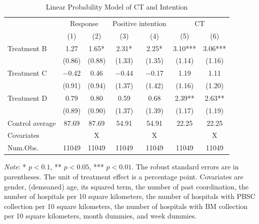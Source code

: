 \documentclass[12pt, a4paper]{article}
\begin{document}
\begin{table}

\caption{\label{tab:stock-reg}Linear Probability Model of CT and Intention}
\centering
\fontsize{9}{11}\selectfont
\begin{threeparttable}
\begin{tabular}[t]{lcccccc}
\toprule
\multicolumn{1}{c}{ } & \multicolumn{2}{c}{Response} & \multicolumn{2}{c}{Positive intention} & \multicolumn{2}{c}{CT} \\
\cmidrule(l{3pt}r{3pt}){2-3} \cmidrule(l{3pt}r{3pt}){4-5} \cmidrule(l{3pt}r{3pt}){6-7}
  & (1) & (2) & (3) & (4) & (5) & (6)\\
\midrule
Treatment B & \num{1.27} & \num{1.65}* & \num{2.31}* & \num{2.25}* & \num{3.10}*** & \num{3.06}***\\
 & (\num{0.86}) & (\num{0.88}) & (\num{1.33}) & (\num{1.35}) & (\num{1.14}) & (\num{1.16})\\
Treatment C & \num{-0.42} & \num{0.46} & \num{-0.44} & \num{-0.17} & \num{1.19} & \num{1.11}\\
 & (\num{0.91}) & (\num{0.94}) & (\num{1.37}) & (\num{1.42}) & (\num{1.16}) & (\num{1.20})\\
Treatment D & \num{0.79} & \num{0.80} & \num{0.59} & \num{0.68} & \num{2.39}** & \num{2.63}**\\
 & (\num{0.89}) & (\num{0.90}) & (\num{1.37}) & (\num{1.39}) & (\num{1.17}) & (\num{1.19})\\
\midrule
Control average & 87.69 & 87.69 & 54.91 & 54.91 & 22.25 & 22.25\\
Covariates &  & X &  & X &  & X\\
Num.Obs. & \num{11049} & \num{11049} & \num{11049} & \num{11049} & \num{11049} & \num{11049}\\
\bottomrule
\end{tabular}
\begin{tablenotes}
\item \emph{Note}: * $p < 0.1$, ** $p < 0.05$, *** $p < 0.01$. The robust standard errors are in parentheses. The unit of treatment effect is a percentage point. Covariates are gender, (demeaned) age, its squared term, the number of past coordination, the number of hospitals per 10 square kilometers, the number of hospitals with PBSC collection per 10 square kilometers, the number of hospitals with BM collection per 10 square kilometers, month dummies, and week dummies.
\end{tablenotes}
\end{threeparttable}
\end{table}
\end{document}
